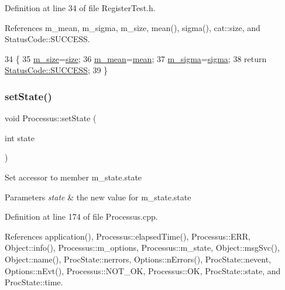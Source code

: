 Definition at line 34 of file Register\+Test.\+h.



References m\+\_\+mean, m\+\_\+sigma, m\+\_\+size, mean(), sigma(), cat\+::size, and Status\+Code\+::\+S\+U\+C\+C\+E\+SS.


\begin{DoxyCode}
34                                                             \{
35     \hyperlink{classRegisterTest_ab543b709d593b4ae36c628c60da76923}{m\_size}=\hyperlink{namespacecat_a3eae50bb86a614752045105e00365a46}{size};
36     \hyperlink{classRegisterTest_aba5ac8088017236617d2244fc0c261b9}{m\_mean}=\hyperlink{classRegisterTest_a5d3726a88a7fdcd90981bb5de8399df9}{mean};
37     \hyperlink{classRegisterTest_a17f1f3646bf00ae7ab6744afca9e6813}{m\_sigma}=\hyperlink{classRegisterTest_af2a1f9ac2798188e52198fc264ae55cc}{sigma};
38     \textcolor{keywordflow}{return} \hyperlink{classStatusCode_a6f565cbeadc76d14c72f047e5e85eb4badd0da38d3ba0d922efd1f4619bc37ad8}{StatusCode::SUCCESS};
39   \}
\end{DoxyCode}
\mbox{\label{classProcessus_ad38cde0f1bcefa00b068e7947b8af927}} 
\subsubsection{\texorpdfstring{set\+State()}{setState()}}
{\footnotesize\ttfamily void Processus\+::set\+State (\begin{DoxyParamCaption}\item[{int}]{state }\end{DoxyParamCaption})\hspace{0.3cm}{\ttfamily [inherited]}}

Set accessor to member m\+\_\+state.\+state 
\begin{DoxyParams}{Parameters}
{\em state} & the new value for m\+\_\+state.\+state \\
\hline
\end{DoxyParams}


Definition at line 174 of file Processus.\+cpp.



References application(), Processus\+::elapsed\+Time(), Processus\+::\+E\+RR, Object\+::info(), Processus\+::m\+\_\+options, Processus\+::m\+\_\+state, Object\+::msg\+Svc(), Object\+::name(), Proc\+State\+::nerrors, Options\+::n\+Errors(), Proc\+State\+::nevent, Options\+::n\+Evt(), Processus\+::\+N\+O\+T\+\_\+\+OK, Processus\+::\+OK, Proc\+State\+::state, and Proc\+State\+::time.



